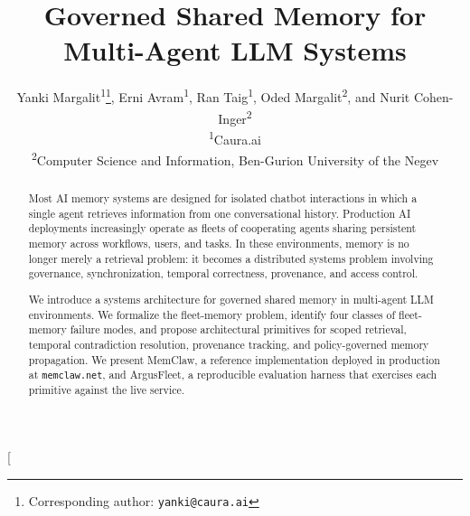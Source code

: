\documentclass[10pt,twocolumn,letterpaper]{article}
\title{
Governed Shared Memory for Multi-Agent LLM Systems
}
\author{
  Yanki Margalit\textsuperscript{1}\thanks{Corresponding author: \texttt{yanki@caura.ai}},
  Erni Avram\textsuperscript{1},
  Ran Taig\textsuperscript{1},
  Oded Margalit\textsuperscript{2},
  and Nurit Cohen-Inger\textsuperscript{2}
  \\[0.5em]
  \textsuperscript{1}Caura.ai \\
  \textsuperscript{2}Computer Science and Information, Ben-Gurion University of the Negev
}
\date{}
\begin{document}
\twocolumn[
  \begin{@twocolumnfalse}
  \maketitle
  \begin{abstract}
  Most AI memory systems are designed for isolated chatbot interactions in which a single agent retrieves information from one conversational history. Production AI deployments increasingly operate as fleets of cooperating agents sharing persistent memory across workflows, users, and tasks. In these environments, memory is no longer merely a retrieval problem: it becomes a distributed systems problem involving governance, synchronization, temporal correctness, provenance, and access control.

  We introduce a systems architecture for governed shared memory in multi-agent LLM environments. We formalize the fleet-memory problem, identify four classes of fleet-memory failure modes, and propose architectural primitives for scoped retrieval, temporal contradiction resolution, provenance tracking, and policy-governed memory propagation. We present MemClaw, a reference implementation deployed in production at \texttt{memclaw.net}, and ArgusFleet, a reproducible evaluation harness that exercises each primitive against the live service.


\end{abstract}
\end{@twocolumnfalse}
\end{document}
